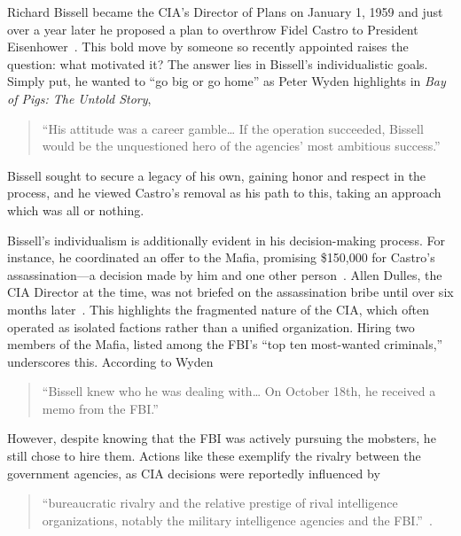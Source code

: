 \documentclass[12pt, draft]{article}
\begin{document}
    Richard Bissell became the CIA's Director of Plans on January 1, 1959 and just over a year later he proposed a plan to overthrow Fidel Castro to President Eisenhower~\parencite{Wyden1979}. This bold move by someone so recently appointed raises the question: what motivated it? The answer lies in Bissell's individualistic goals. Simply put, he wanted to “go big or go home” as Peter Wyden highlights in \textit{Bay of Pigs: The Untold Story}, 

    \begin{quotation}
        “His attitude was a career gamble… If the operation succeeded, Bissell would be the unquestioned hero of the agencies' most ambitious success.”
    \end{quotation} 

    Bissell sought to secure a legacy of his own, gaining honor and respect in the process, and he viewed Castro's removal as his path to this, taking an approach which was all or nothing.

    Bissell's individualism is additionally evident in his decision-making process. For instance, he coordinated an offer to the Mafia, promising \$150,000 for Castro's assassination—a decision made by him and one other person~\parencite{Wyden1979}. Allen Dulles, the CIA Director at the time, was not briefed on the assassination bribe until over six months later~\parencite{Wyden1979}. This highlights the fragmented nature of the CIA, which often operated as isolated factions rather than a unified organization. Hiring two members of the Mafia, listed among the FBI's “top ten most-wanted criminals,” underscores this. According to Wyden 

    \begin{quotation}
        “Bissell knew who he was dealing with… On October 18th, he received a memo from the FBI.”~\parencite{Wyden1979}
    \end{quotation}  

    However, despite knowing that the FBI was actively pursuing the mobsters, he still chose to hire them. Actions like these exemplify the rivalry between the government agencies, as CIA decisions were reportedly influenced by 

    \begin{quotation} 
        “bureaucratic rivalry and the relative prestige of rival intelligence organizations, notably the military intelligence agencies and the FBI.”~\parencite{JeffreysJones2003}.
    \end{quotation} 
    
\end{document}
